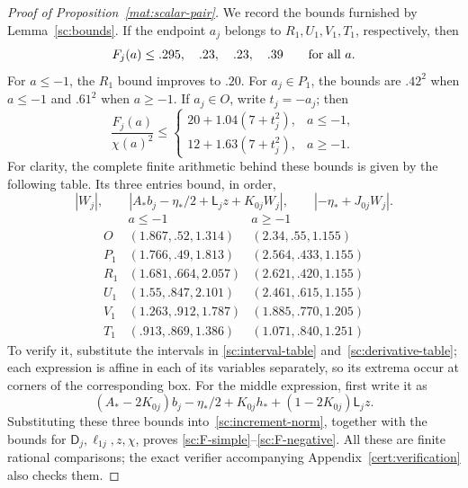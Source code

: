 \documentclass[11pt]{article}
\theoremstyle{definition}
\theoremstyle{remark}
\numberwithin{equation}{section}
\begin{document}
\begin{proof}[Proof of Proposition~\ref{mat:scalar-pair}]
We record the bounds furnished by Lemma~\ref{sc:bounds}.  If the endpoint
$a_j$ belongs to $R_1,U_1,V_1,T_1$, respectively, then
\begin{equation}\label{sc:F-simple}
 F_j(a)\le .295,\quad .23,\quad .23,\quad .39
 \qquad\hbox{for all }a.
\end{equation}
For $a\le-1$, the $R_1$ bound improves to $.20$.
For $a_j\in P_1$, the bounds are $.42^2$ when $a\le-1$ and $.61^2$
when $a\ge-1$.  If $a_j\in O$, write $t_j=-a_j$; then
\begin{equation}\label{sc:F-negative}
 \frac{F_j(a)}{\chi(a)^2}\le
 \begin{cases}
 20+1.04(7+t_j^2),&a\le-1,\\
 12+1.63(7+t_j^2),&a\ge-1.
 \end{cases}
\end{equation}
For clarity, the complete finite arithmetic behind these bounds is given
by the following table.  Its three entries bound, in order,
\[
 |W_j|,\qquad
 |A_*b_j-\eta_*/2+\mathsf L_jz+K_{0j}W_j|,\qquad
 |-\eta_*+J_{0j}W_j|.
\]
\begin{equation}\label{sc:substitution-table}
\begin{array}{c|cc}
 &a\le-1&a\ge-1\\\hline
 O&(1.867,.52,1.314)&(2.34,.55,1.155)\\
 P_1&(1.766,.49,1.813)&(2.564,.433,1.155)\\
 R_1&(1.681,.664,2.057)&(2.621,.420,1.155)\\
 U_1&(1.55,.847,2.101)&(2.461,.615,1.155)\\
 V_1&(1.263,.912,1.787)&(1.885,.770,1.205)\\
 T_1&(.913,.869,1.386)&(1.071,.840,1.251)
\end{array}
\end{equation}
To verify it, substitute the intervals in
\eqref{sc:interval-table} and~\eqref{sc:derivative-table}; each expression
is affine in each of its variables separately, so its extrema occur at
corners of the corresponding box.  For the middle expression, first write
it as
\[
 (A_*-2K_{0j})b_j-\eta_*/2+K_{0j}h_*+
 (1-2K_{0j})\mathsf L_jz.
\]
Substituting these three bounds into~\eqref{sc:increment-norm}, together
with the bounds for $\mathsf D_j,\ell_{1j},z,\chi$, proves
\eqref{sc:F-simple}--\eqref{sc:F-negative}.  All these are finite rational
comparisons; the exact verifier accompanying Appendix~\ref{cert:verification}
also checks them.


\end{proof}
\end{document}
